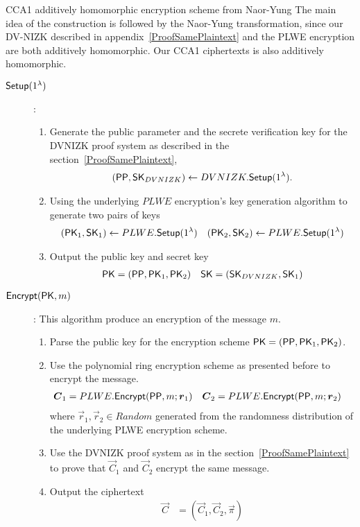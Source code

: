 \begin{section}{CCA1 additively homomorphic encryption scheme from Naor-Yung}
  The main idea of the construction is followed by the Naor-Yung transformation,
  since our DV-NIZK described in appendix~\ref{ProofSamePlaintext} and the PLWE encryption are both additively homomorphic.
  Our CCA1 ciphertexts is also additively homomorphic.

  \begin{description}
    \item [${\mathsf{Setup}}(1^\lambda)$]:
    \begin{enumerate}
      \item Generate the public parameter and the secrete verification key for the DVNIZK proof system as described in the section~\ref{ProofSamePlaintext},
      \begin{align*}
        ({\mathsf{PP}},\mathsf{SK}_{DVNIZK}) \gets DVNIZK.{\mathsf{Setup}}(1^\lambda).
      \end{align*}
      \item Using the underlying $PLWE$ encryption's key generation algorithm to generate two pairs of keys
      \begin{align*}
        (\mathsf{PK}_1, \mathsf{SK}_1) &\gets PLWE.{\mathsf{Setup}}(1^\lambda) & (\mathsf{PK}_2, \mathsf{SK}_2) &\gets PLWE.{\mathsf{Setup}}(1^\lambda) \\
      \end{align*}
      \item Output the public key and secret key
      \begin{align*}
        \mathsf{PK} &= ({\mathsf{PP}}, \mathsf{PK}_1, \mathsf{PK}_2) & \mathsf{SK} = (\mathsf{SK}_{DVNIZK}, \mathsf{SK}_1)
      \end{align*}
    \end{enumerate}


    \item[${\mathsf{Encrypt}}(\mathsf{PK}, m)$]: This algorithm produce an encryption of the message $m$.
    \begin{enumerate}
      \item Parse the public key for the encryption scheme $\mathsf{PK} = ({\mathsf{PP}}, \mathsf{PK}_1, \mathsf{PK}_2)$.
      \item Use the polynomial ring encryption scheme as presented before to encrypt the message.
      \begin{align*}
        \vec{C}_1 &= PLWE.\Enc(\PPP, m; \vec{r}_1) & \vec{C}_2 &= PLWE.\Enc(\PPP, m; \vec{r}_2)
      \end{align*}
      where $\vec{r}_1, \vec{r}_2 \in Random$ generated from the randomness distribution of the underlying PLWE encryption scheme.
      \item Use the DVNIZK proof system as in the section~\ref{ProofSamePlaintext} to prove that $\vec{C}_1$ and $\vec{C}_2$ encrypt the same message.
      \item Output the ciphertext
      \begin{align*}
        \vec{C} &= (\vec{C}_1, \vec{C}_2, \vec{\pi})
      \end{align*}
    \end{enumerate}



\end{description}
\end{section}
